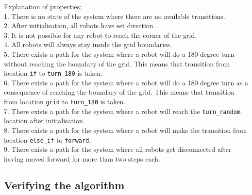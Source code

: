\noindent
Explanation of properties:\\
1. There is no state of the system where there are no available transitions.\\
2. After initialisation, all robots have set direction.\\
3. It is not possible for any robot to reach the corner of the grid.\\
4. All robots will always stay inside the grid boundaries.\\
5. There exists a path for the system where a robot will do a 180 degree turn without reaching the boundary of the grid. This means that transition from location \texttt{if} to \texttt{turn\_180} is taken.\\
6. There exists a path for the system where a robot will do a 180 degree turn as a consequence of reaching the boundary of the grid. This means that transition from location \texttt{grid} to \texttt{turn\_180} is taken.\\
7. There exists a path for the system where a robot will reach the \texttt{turn\_random} location after initialisation.\\
8. There exists a path for the system where a robot will make the transition from location \texttt{else\_if} to \texttt{forward}.\\
9. There exists a path for the system where all robots get disconnected after having moved forward for more than two steps each.\\







\subsection{Verifying the algorithm}

